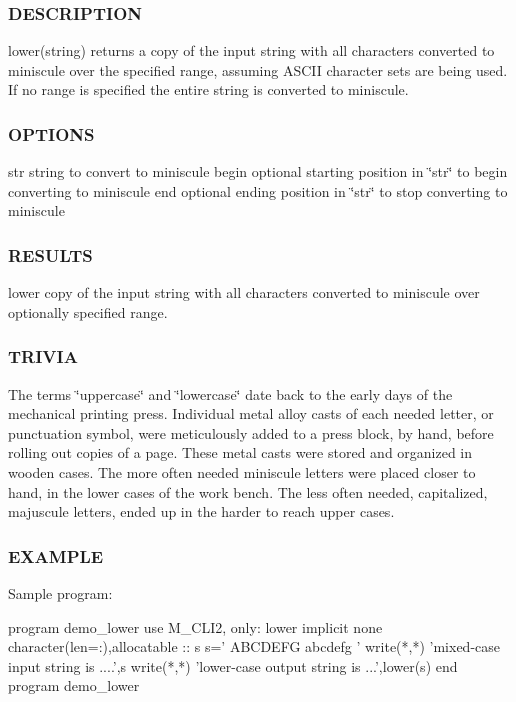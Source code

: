  \subsubsection*{D\+E\+S\+C\+R\+I\+P\+T\+I\+ON}

lower(string) returns a copy of the input string with all characters converted to miniscule over the specified range, assuming A\+S\+C\+II character sets are being used. If no range is specified the entire string is converted to miniscule.

\subsubsection*{O\+P\+T\+I\+O\+NS}

str string to convert to miniscule begin optional starting position in \char`\"{}str\char`\"{} to begin converting to miniscule end optional ending position in \char`\"{}str\char`\"{} to stop converting to miniscule

\subsubsection*{R\+E\+S\+U\+L\+TS}

lower copy of the input string with all characters converted to miniscule over optionally specified range.

\subsubsection*{T\+R\+I\+V\+IA}

The terms \char`\"{}uppercase\char`\"{} and \char`\"{}lowercase\char`\"{} date back to the early days of the mechanical printing press. Individual metal alloy casts of each needed letter, or punctuation symbol, were meticulously added to a press block, by hand, before rolling out copies of a page. These metal casts were stored and organized in wooden cases. The more often needed miniscule letters were placed closer to hand, in the lower cases of the work bench. The less often needed, capitalized, majuscule letters, ended up in the harder to reach upper cases.

\subsubsection*{E\+X\+A\+M\+P\+LE}

Sample program\+: \begin{DoxyVerb}  program demo_lower
  use M_CLI2, only: lower
  implicit none
  character(len=:),allocatable  :: s
     s=' ABCDEFG abcdefg '
     write(*,*) 'mixed-case input string is ....',s
     write(*,*) 'lower-case output string is ...',lower(s)
  end program demo_lower
\end{DoxyVerb}


